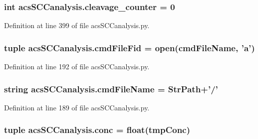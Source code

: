 \hypertarget{a00128_a0dd6730b063ac11ae4620c4a0778f6d9}{
\subsubsection[{cleavage\-\_\-counter}]{\setlength{\rightskip}{0pt plus 5cm}int acs\-S\-C\-Canalysis.\-cleavage\-\_\-counter = 0}}\label{a00128_a0dd6730b063ac11ae4620c4a0778f6d9}


Definition at line 399 of file acs\-S\-C\-Canalysis.\-py.

\hypertarget{a00128_a0a501feb02e67bd6a8ba75490709cf89}{
\subsubsection[{cmd\-File\-Fid}]{\setlength{\rightskip}{0pt plus 5cm}tuple acs\-S\-C\-Canalysis.\-cmd\-File\-Fid = open({\bf cmd\-File\-Name}, '{\bf a}')}}\label{a00128_a0a501feb02e67bd6a8ba75490709cf89}


Definition at line 192 of file acs\-S\-C\-Canalysis.\-py.

\hypertarget{a00128_a32551f85ad3cd8080b8ad81828276368}{
\subsubsection[{cmd\-File\-Name}]{\setlength{\rightskip}{0pt plus 5cm}string acs\-S\-C\-Canalysis.\-cmd\-File\-Name = {\bf Str\-Path}+'/'}}\label{a00128_a32551f85ad3cd8080b8ad81828276368}


Definition at line 189 of file acs\-S\-C\-Canalysis.\-py.

\hypertarget{a00128_a6ec435b19c74f79f32a0eae7bb2bd1c8}{
\subsubsection[{conc}]{\setlength{\rightskip}{0pt plus 5cm}tuple acs\-S\-C\-Canalysis.\-conc = float(tmp\-Conc)}}\label{a00128_a6ec435b19c74f79f32a0eae7bb2bd1c8}



